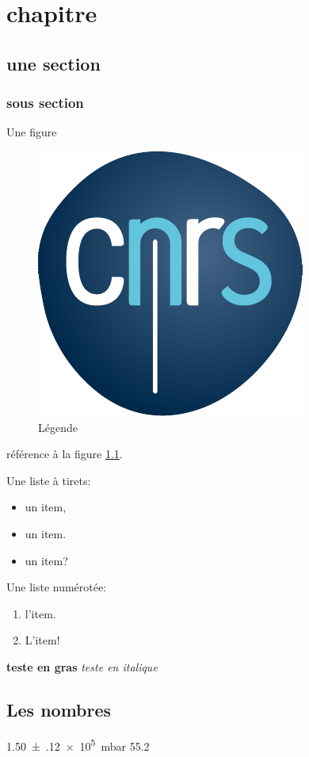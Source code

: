 \chapter{chapitre}
\section{une section}
\subsection{sous section}
Une figure
\begin{figure}
    \centering
    \includegraphics[width = \textwidth]{Files/Logos/logo_cnrs.pdf}
    \caption[Légende pour la table des figures]{Légende}
    \label{fig:label}
\end{figure}
référence à la figure \ref{fig:label}.

Une liste à tirets:
\begin{itemize}
    \item un item,
    \item un item.
    \item un item?
\end{itemize}

Une liste numérotée:
\begin{enumerate}
    \item l'item.
    \item L'item!
\end{enumerate}

\textbf{teste en gras}
\textit{teste en italique}

\section{Les nombres}
\SI{1.50(12)e5}{\milli\bar}
\num{55.2}
